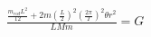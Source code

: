 \documentclass[preview]{standalone}
\begin{document}
\begin{align*}
\frac{\frac{m_{rod}L^2}{12}+2m(\frac{L}{2})^2(\frac{2\pi}{T})^2\theta r^2}{LMm} = G
\end{align*}
\end{document}
